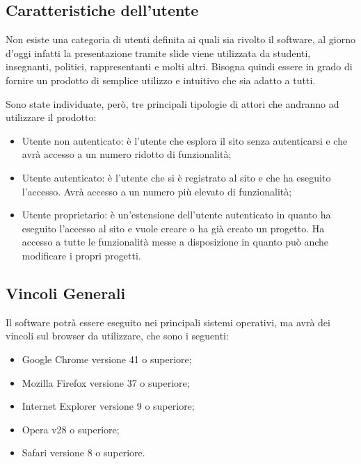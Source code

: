 \subsection{Caratteristiche dell'utente}
Non esiste una categoria di utenti definita ai quali sia rivolto il software, al giorno d'oggi infatti la presentazione tramite \gls{slide} viene utilizzata da studenti, insegnanti, politici, rappresentanti e molti altri. Bisogna quindi essere in grado di fornire un prodotto di semplice utilizzo e intuitivo che sia adatto a tutti.

Sono state individuate, però, tre principali tipologie di attori che andranno ad utilizzare il prodotto:
\begin{itemize}
	\item Utente non autenticato: è l'utente che esplora il sito senza autenticarsi e che avrà accesso a un numero ridotto di funzionalità;
	\item Utente autenticato: è l'utente che si è registrato al sito e che ha eseguito l'accesso. Avrà accesso a un numero più elevato di funzionalità;
	\item Utente proprietario: è un'estensione dell'utente autenticato in quanto ha eseguito l'accesso al sito e vuole creare o ha già creato un progetto. Ha accesso a tutte le funzionalità messe a disposizione in quanto può anche modificare i propri progetti.
\end{itemize}

\subsection{Vincoli Generali}
Il software potrà essere eseguito nei principali sistemi operativi, ma avrà dei vincoli sul \gls{browser} da utilizzare, che sono i seguenti:
\begin{itemize}
	\item Google Chrome versione 41 o superiore;
	\item Mozilla Firefox versione 37 o superiore;
	\item Internet Explorer versione 9 o superiore;
	\item Opera v28 o superiore;
	\item Safari versione 8 o superiore.
\end{itemize}

